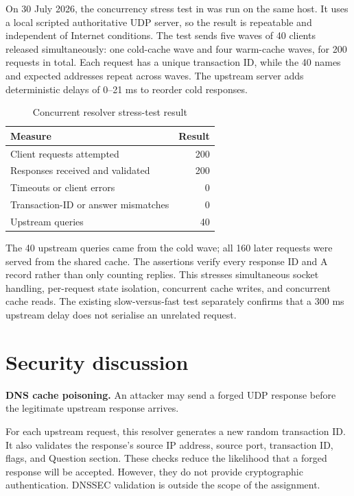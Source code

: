 \documentclass[11pt,a4paper]{article}
\begin{document}
On 30 July 2026, the concurrency stress test in
 was run on the same host. It uses a
local scripted authoritative UDP server, so the result is repeatable and
independent of Internet conditions. The test sends five waves of 40 clients
released simultaneously: one cold-cache wave and four warm-cache waves, for 200
requests in total. Each request has a unique transaction ID, while the 40 names
and expected addresses repeat across waves. The upstream server adds
deterministic delays of 0--21 ms to reorder cold responses.

\begin{table}[htbp]
    \centering
    \caption{Concurrent resolver stress-test result}
    \label{tab:concurrency-stress}
    \vspace{0.5em}

    \begin{tabular}{lr}
        \toprule
        \textbf{Measure} & \textbf{Result} \\
        \midrule
        Client requests attempted & 200 \\
        Responses received and validated & 200 \\
        Timeouts or client errors & 0 \\
        Transaction-ID or answer mismatches & 0 \\
        Upstream queries & 40 \\
        \bottomrule
    \end{tabular}
\end{table}

The 40 upstream queries came from the cold wave; all 160 later requests were
served from the shared cache. The assertions verify every response ID and A
record rather than only counting replies. This stresses simultaneous socket
handling, per-request state isolation, concurrent cache writes, and concurrent
cache reads. The existing slow-versus-fast test separately confirms that a
300 ms upstream delay does not serialise an unrelated request.

\section{Security discussion}

\textbf{DNS cache poisoning.} An attacker may send a forged UDP response before
the legitimate upstream response arrives.

For each upstream request, this resolver generates a new random transaction ID.
It also validates the response's source IP address, source port, transaction ID,
flags, and Question section. These checks reduce the likelihood that a forged
response will be accepted. However, they do not provide cryptographic
authentication. DNSSEC validation is outside the scope of the assignment.
\end{document}
